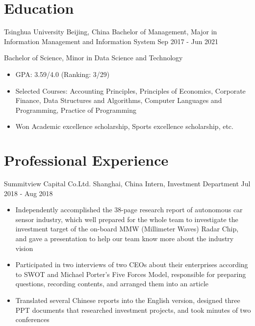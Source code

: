 \documentclass{resumeEN}
\begin{document}

    \section{Education}

    \Experience
    {Tsinghua University}
    {Beijing, China}
    {Bachelor of Management, Major in Information Management and Information System}
    {Sep 2017 - Jun 2021}

    Bachelor of Science, Minor in Data Science and Technology
    \begin{itemize}
        \item GPA: 3.59/4.0 (Ranking: 3/29)
        \item Selected Courses: Accounting Principles, Principles of Economics, Corporate Finance, Data Structures and Algorithms, Computer Languages and Programming, Practice of Programming
        \item Won Academic excellence scholarship, Sports excellence scholarship, etc.
    \end{itemize}

    \section{Professional Experience}

    \Experience
    {Summitview Capital Co.Ltd.}
    {Shanghai, China}
    {Intern, Investment Department}
    {Jul 2018 - Aug 2018}

    \begin{itemize}
        \item Independently accomplished the 38-page research report of autonomous car sensor industry, which well prepared for the whole team to investigate the investment target of the on-board MMW (Millimeter Waves) Radar Chip, and gave a presentation to help our team know more about the industry vision
        \item Participated in two interviews of two CEOs about their enterprises according to SWOT and Michael Porter's Five Forces Model, responsible for preparing questions, recording contents, and arranged them into an article
        \item Translated several Chinese reports into the English version, designed three PPT documents that researched investment projects, and took minutes of two conferences
    \end{itemize}
\end{document}

